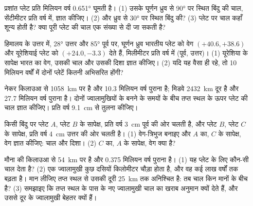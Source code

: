 \begin{exercise}[$\star\star$]\label{exo:g11:plate-motions:8}
प्रशांत प्लेट प्रति मिलियन वर्ष \ang{0.651} घूमती है। (1) उसके घूर्णन ध्रुव से
\ang{90} पर स्थित बिंदु की चाल, सेंटीमीटर प्रति वर्ष में, ज्ञात कीजिए। (2) और
ध्रुव से \ang{30} पर स्थित बिंदु की? (3) प्लेट पर चाल कहाँ शून्य होती है? क्या
पूरी प्लेट की चाल एक संख्या से दी जा सकती है?
\end{exercise}

\begin{exercise}[$\star\star$]\label{exo:g11:plate-motions:9}
हिमालय के उत्तर में, \ang{28} उत्तर और \ang{85} पूर्व पर, घूर्णन ध्रुव
भारतीय प्लेट को वेग $(+40.6, +38.6)$ और यूरेशियाई प्लेट को
$(+24.0, -3.3)$ देते हैं, मिलीमीटर प्रति वर्ष में (पूर्व, उत्तर)। (1) यूरेशिया के सापेक्ष
भारत का वेग, उसकी चाल और उसकी दिशा ज्ञात कीजिए। (2) यदि यह
वैसा ही रहे, तो 10 मिलियन वर्षों में दोनों प्लेटें कितनी अभिसरित होंगी?
\end{exercise}

\begin{exercise}[$\star\star$]\label{exo:g11:plate-motions:10}
नेकर किलाउआ से \qty{1058}{km} पर है और \num{10.3} मिलियन वर्ष पुराना है;
मिडवे \qty{2432}{km} दूर है और \num{27.7} मिलियन वर्ष पुराना है। दोनों ज्वालामुखियों के
बनने के समयों के बीच तप्त स्थल के ऊपर प्लेट की चाल ज्ञात कीजिए।
प्रति वर्ष \qty{9.1}{cm} से तुलना कीजिए।
\end{exercise}

\begin{exercise}[$\star\star$]\label{exo:g11:plate-motions:11}
किसी बिंदु पर प्लेट $A$, प्लेट $B$ के सापेक्ष, प्रति वर्ष \qty{3}{cm} पूर्व की ओर चलती है,
और प्लेट $B$, प्लेट $C$ के सापेक्ष, प्रति वर्ष \qty{4}{cm} उत्तर की ओर चलती है।
(1) वेग-त्रिभुज बनाइए और $A$ का, $C$ के सापेक्ष, वेग ज्ञात कीजिए:
चाल और दिशा। (2) $C$ का, $A$ के सापेक्ष, वेग क्या है?
\end{exercise}

\begin{exercise}[$\star\star\star$]\label{exo:g11:plate-motions:12}
मौना की किलाउआ से \qty{54}{km} पर है और \num{0.375} मिलियन वर्ष
पुराना है। (1) यह प्लेट के लिए कौन-सी चाल देता है? (2) एक ज्वालामुखी कुछ दसियों
किलोमीटर चौड़ा होता है, और वह कई लाख वर्षों तक बढ़ता है। मान लीजिए
तप्त स्थल से उसकी दूरी \qty{25}{km} तक अनिश्चित है: तब चाल किन
मानों के बीच है? (3) समझाइए कि तप्त स्थल के पास के नए ज्वालामुखी
चाल का खराब अनुमान क्यों देते हैं, और उससे दूर के ज्वालामुखी
बेहतर क्यों हैं।
\end{exercise}

